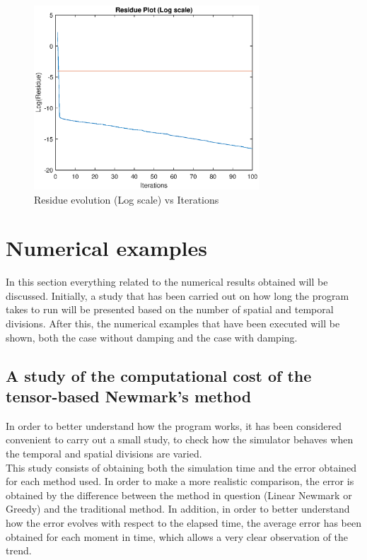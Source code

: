 \documentclass{ws-m3as}
\begin{document}
\begin{figure}
\centering
\includegraphics[width=0.75\textwidth]{ResIterLog.eps}
\caption{Residue evolution (Log scale) vs Iterations } 
\label{ResIterLog}
\end{figure}


\section{Numerical examples}

In this section everything related to the numerical results obtained will be discussed. Initially, a study that has been carried out on how long the program takes to run will be presented based on the number of spatial and temporal divisions. After this, the numerical examples that have been executed will be shown, both the case without damping and the case with damping.

\subsection{A study of the computational cost of the tensor-based Newmark's method}

In order to better understand how the program works, it has been considered convenient to carry out a small study, to check how the simulator behaves when the temporal and spatial divisions are varied.\\



This study consists of obtaining both the simulation time and the error obtained for each method used. In order to make a more realistic comparison, the error is obtained by the difference between the method in question (Linear Newmark or Greedy) and the traditional method. In addition, in order to better understand how the error evolves with respect to the elapsed time, the average error has been obtained for each moment in time, which allows a very clear observation of the trend.
\end{document}
